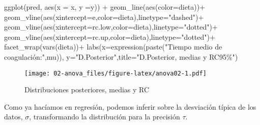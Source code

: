 \documentclass[
]{book}
\newenvironment{Shaded}{\begin{snugshade}}{\end{snugshade}}
\newcommand{\AttributeTok}[1]{\textcolor[rgb]{0.77,0.63,0.00}{#1}}
\newcommand{\FunctionTok}[1]{\textcolor[rgb]{0.00,0.00,0.00}{#1}}
\newcommand{\NormalTok}[1]{#1}
\newcommand{\SpecialCharTok}[1]{\textcolor[rgb]{0.00,0.00,0.00}{#1}}
\newcommand{\StringTok}[1]{\textcolor[rgb]{0.31,0.60,0.02}{#1}}
\begin{document}
\begin{Shaded}
\begin{Highlighting}[]
\FunctionTok{ggplot}\NormalTok{(pred, }\FunctionTok{aes}\NormalTok{(}\AttributeTok{x =}\NormalTok{ x, }\AttributeTok{y =}\NormalTok{y)) }\SpecialCharTok{+} 
  \FunctionTok{geom\_line}\NormalTok{(}\FunctionTok{aes}\NormalTok{(}\AttributeTok{color=}\NormalTok{dieta))}\SpecialCharTok{+}
  \FunctionTok{geom\_vline}\NormalTok{(}\FunctionTok{aes}\NormalTok{(}\AttributeTok{xintercept=}\NormalTok{e,}\AttributeTok{color=}\NormalTok{dieta),}\AttributeTok{linetype=}\StringTok{"dashed"}\NormalTok{)}\SpecialCharTok{+}
  \FunctionTok{geom\_vline}\NormalTok{(}\FunctionTok{aes}\NormalTok{(}\AttributeTok{xintercept=}\NormalTok{rc.low,}\AttributeTok{color=}\NormalTok{dieta),}\AttributeTok{linetype=}\StringTok{"dotted"}\NormalTok{)}\SpecialCharTok{+}
  \FunctionTok{geom\_vline}\NormalTok{(}\FunctionTok{aes}\NormalTok{(}\AttributeTok{xintercept=}\NormalTok{rc.up,}\AttributeTok{color=}\NormalTok{dieta),}\AttributeTok{linetype=}\StringTok{"dotted"}\NormalTok{)}\SpecialCharTok{+}
  \FunctionTok{facet\_wrap}\NormalTok{(}\FunctionTok{vars}\NormalTok{(dieta))}\SpecialCharTok{+}
  \FunctionTok{labs}\NormalTok{(}\AttributeTok{x=}\FunctionTok{expression}\NormalTok{(}\FunctionTok{paste}\NormalTok{(}\StringTok{"Tiempo medio de coagulación:"}\NormalTok{,mu)),}
       \AttributeTok{y=}\StringTok{"D.Posterior"}\NormalTok{,}\AttributeTok{title=}\StringTok{"D.Posterior, medias y RC95\%"}\NormalTok{)}
\end{Highlighting}
\end{Shaded}

\begin{figure}
\centering
\texttt{[image: 02-anova\_files/figure-latex/anova02-1.pdf]}
\caption{\label{fig:anova02}Distribuciones posteriores, medias y RC}
\end{figure}

Como ya hacíamos en regresión, podemos inferir sobre la desviación típica de los datos, \(\sigma\), transformando la distribución para la precisión \(\tau\).
\end{document}
